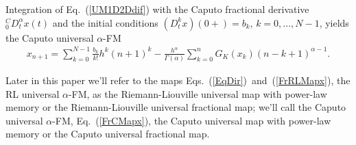 \documentclass[graybox]{svmult}
\begin{document}
Integration of Eq.~(\ref{UM1D2Ddif}) with the Caputo fractional derivative
$_0^CD^{\alpha}_t x(t)$ and the initial conditions
$(D^{k}_tx)(0+)=b_k$,  
$k=0,...,N-1$, yields the Caputo  universal $\alpha$-FM 
\begin{eqnarray}
x_{n+1}= \sum^{N-1}_{k=0}\frac{b_k}{k!}h^k(n+1)^{k} 
-\frac{h^{\alpha}}{\Gamma(\alpha)}\sum^{n}_{k=0} G_K(x_k) (n-k+1)^{\alpha-1}.
\label{FrCMapx}
\end{eqnarray} 








 Later in this paper we'll refer to the maps 
Eqs.~(\ref{EqDir})~and~(\ref{FrRLMapx}), the RL universal $\alpha$-FM, as
the Riemann-Liouville universal map with power-law memory or 
the Riemann-Liouville universal fractional map; 
we'll call the Caputo universal  $\alpha$-FM, Eq.~(\ref{FrCMapx}),     
the Caputo universal map with power-law memory or 
the Caputo universal fractional map.
\end{document}
